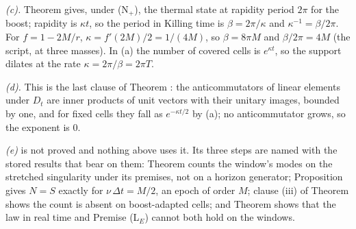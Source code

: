 \emph{(c).} Theorem  gives, under (N$_{+}$), the thermal state at rapidity period $2\pi$ for the boost; rapidity is $\kappa t$, so the period in Killing time is $\beta = 2\pi/\kappa$ and $\kappa^{-1} = \beta/2\pi$. For $f = 1 - 2M/r$, $\kappa = f'(2M)/2 = 1/(4M)$, so $\beta = 8\pi M$ and $\beta/2\pi = 4M$ (the script, at three masses). In (a) the number of covered cells is $e^{\kappa t}$, so the support dilates at the rate $\kappa = 2\pi/\beta = 2\pi T$.

\emph{(d).} This is the last clause of Theorem : the anticommutators of linear elements under $D_{t}$ are inner products of unit vectors with their unitary images, bounded by one, and for fixed cells they fall as $e^{-\kappa t/2}$ by (a); no anticommutator grows, so the exponent is $0$.

\emph{(e)} is not proved and nothing above uses it. Its three steps are named with the stored results that bear on them: Theorem  counts the window's modes on the stretched singularity under its premises, not on a horizon generator; Proposition  gives $N = S$ exactly for $\nu\,\Delta t = M/2$, an epoch of order $M$; clause (iii) of Theorem  shows the count is absent on boost-adapted cells; and Theorem  shows that the law in real time and Premise (L$_{E}$) cannot both hold on the windows.
